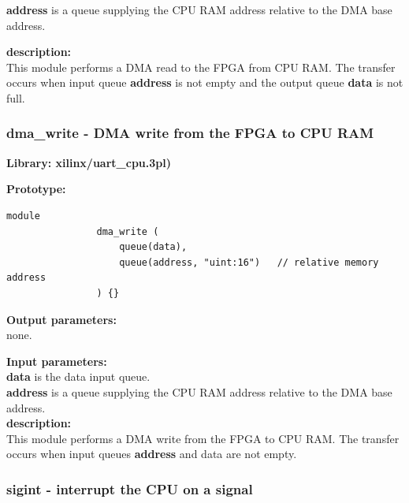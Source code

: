                 {\bf address} is a queue supplying the CPU RAM address
                relative to the DMA base address.
                       
            {\bf description:} \\
            This module performs a DMA read to the FPGA from CPU RAM. The
            transfer occurs when input queue {\bf address} is not empty
            and the output queue {\bf data} is not full.\\







        \subsubsection{dma\_write - DMA write from the FPGA to CPU RAM}\label{sec:lmuartcpudmaw}

            {\bf Library: xilinx/uart\_cpu.3pl)}

            {\bf Prototype:} \\
            \vsp
            \begin{lstlisting}[gobble=12, language=threepl]
                module
                dma_write (
                    queue(data),
                    queue(address, "uint:16")   // relative memory address
                ) {}
            \end{lstlisting}
            
            {\bf Output parameters:} \\
            
                none.                       
            
            {\bf Input parameters:} \\
                        
                {\bf data} is the data input queue.\\
                {\bf address} is a queue supplying the CPU RAM address
                relative to the DMA base address.\\
                       
            {\bf description:} \\
            This module performs a DMA write from the FPGA to CPU RAM. The
            transfer occurs when input queues {\bf address} and data are
            not empty.

        \subsubsection{sigint - interrupt the CPU on a signal}\label{sec:lmuartcpusigint}

